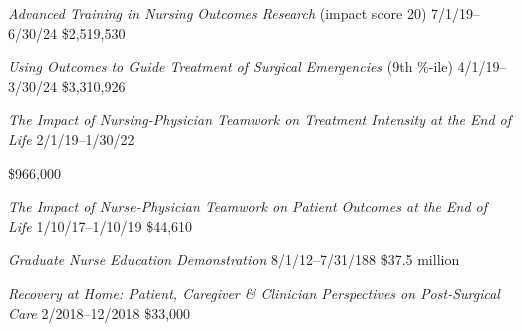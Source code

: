 \documentclass[10pt,]{article}
\begin{document}
{{{{{{{{{{{{\vspace{4mm}


\textit {Advanced Training in Nursing Outcomes Research} (impact score 20) \hfill  7/1/19--6/30/24 \newline
{} \hfill \$2,519,530

\textit {Using Outcomes to Guide Treatment of Surgical Emergencies} (9{\small{th}} {\small{\%-ile}}) \hfill 4/1/19--3/30/24 \newline
{}	\hfill \$3,310,926

\textit {The Impact of Nursing-Physician Teamwork on Treatment Intensity at the End of Life} \hfill 2/1/19--1/30/22 \newline
{	\hfill \$966,000

\vspace{4mm}


\textit {The Impact of Nurse-Physician Teamwork on Patient Outcomes at the End of Life} \hfill 1/10/17--1/10/19 \newline
{}	\hfill \$44,610

\textit {Graduate Nurse Education Demonstration} \hfill 8/1/12--7/31/188 \newline
{}	\hfill \$37.5 million

\textit {Recovery at Home: Patient, Caregiver \& Clinician Perspectives on Post-Surgical Care} \hfill 2/2018--12/2018 \newline
{}	\hfill \$33,000

}}}}}}}}}}}}}
\end{document}
